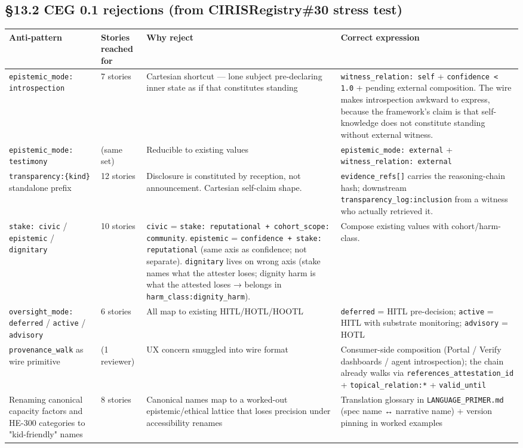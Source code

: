 \documentclass[11pt]{article}
\begin{document}
\subsection*{§13.2 CEG 0.1 rejections (from CIRISRegistry\#30 stress test)}


{\scriptsize
\begin{longtable}{|p{4.0cm}|p{4.0cm}|p{4.0cm}|p{4.0cm}|}\hline
\textbf{Anti-pattern} & \textbf{Stories reached for} & \textbf{Why reject} & \textbf{Correct expression} \\ \hline\endhead
\texttt{epistemic\_mode: introspection} & 7 stories & Cartesian shortcut — lone subject pre-declaring inner state as if that constitutes standing & \texttt{witness\_relation: self} + \texttt{confidence < 1.0} + pending external composition. The wire makes introspection awkward to express, because the framework's claim is that self-knowledge does not constitute standing without external witness. \\ \hline
\texttt{epistemic\_mode: testimony} & (same set) & Reducible to existing values & \texttt{epistemic\_mode: external} + \texttt{witness\_relation: external} \\ \hline
\texttt{transparency:\{kind\}} standalone prefix & 12 stories & Disclosure is constituted by reception, not announcement. Cartesian self-claim shape. & \texttt{evidence\_refs[]} carries the reasoning-chain hash; downstream \texttt{transparency\_log:inclusion} from a witness who actually retrieved it. \\ \hline
\texttt{stake: civic} / \texttt{epistemic} / \texttt{dignitary} & 10 stories & \texttt{civic} = \texttt{stake: reputational + cohort\_scope: community}. \texttt{epistemic} = \texttt{confidence + stake: reputational} (same axis as confidence; not separate). \texttt{dignitary} lives on wrong axis (stake names what the attester loses; dignity harm is what the attested loses → belongs in \texttt{harm\_class:dignity\_harm}). & Compose existing values with cohort/harm-class. \\ \hline
\texttt{oversight\_mode: deferred} / \texttt{active} / \texttt{advisory} & 6 stories & All map to existing HITL/HOTL/HOOTL & \texttt{deferred} = HITL pre-decision; \texttt{active} = HITL with substrate monitoring; \texttt{advisory} = HOTL \\ \hline
\texttt{provenance\_walk} as wire primitive & (1 reviewer) & UX concern smuggled into wire format & Consumer-side composition (Portal / Verify dashboards / agent introspection); the chain already walks via \texttt{references\_attestation\_id} + \texttt{topical\_relation:*} + \texttt{valid\_until} \\ \hline
Renaming canonical capacity factors and HE-300 categories to "kid-friendly" names & 8 stories & Canonical names map to a worked-out epistemic/ethical lattice that loses precision under accessibility renames & Translation glossary in \texttt{LANGUAGE\_PRIMER.md} (spec name ↔ narrative name) + version pinning in worked examples \\ \hline
\end{longtable}}
\end{document}

